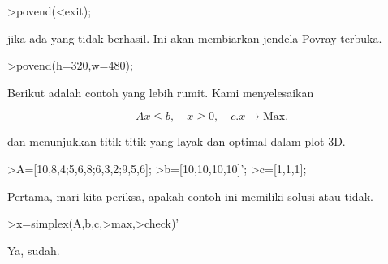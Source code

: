 \documentclass[a4paper,10pt]{article}
\begin{document}
\begin{eulernotebook}
\begin{eulercomment}
\begin{eulercomment}
\begin{eulercomment}
\begin{eulercomment}
\begin{eulercomment}
\begin{eulercomment}
\begin{eulercomment}
\begin{eulercomment}
\begin{eulercomment}
\begin{eulercomment}
\begin{eulercomment}
\end{eulercomment}
\begin{eulerttcomment}
 >povend(<exit);
\end{eulerttcomment}
\begin{eulercomment}

jika ada yang tidak berhasil. Ini akan membiarkan jendela Povray
terbuka.
\end{eulercomment}
\begin{eulerprompt}
>povend(h=320,w=480);
\end{eulerprompt}
\begin{eulercomment}
Berikut adalah contoh yang lebih rumit. Kami menyelesaikan

\end{eulercomment}
\begin{eulerformula}
\[
Ax \le b, \quad x \ge 0, \quad c.x \to \text{Max.}
\]
\end{eulerformula}
\begin{eulercomment}
dan menunjukkan titik-titik yang layak dan optimal dalam plot 3D.
\end{eulercomment}
\begin{eulerprompt}
>A=[10,8,4;5,6,8;6,3,2;9,5,6];
>b=[10,10,10,10]';
>c=[1,1,1];
\end{eulerprompt}
\begin{eulercomment}
Pertama, mari kita periksa, apakah contoh ini memiliki solusi atau
tidak.
\end{eulercomment}
\begin{eulerprompt}
>x=simplex(A,b,c,>max,>check)'
\end{eulerprompt}
\begin{euleroutput}
  [0,  1,  0.5]
\end{euleroutput}
\begin{eulercomment}
Ya, sudah.



\end{eulercomment}
\end{eulercomment}
\end{eulercomment}
\end{eulercomment}
\end{eulercomment}
\end{eulercomment}
\end{eulercomment}
\end{eulercomment}
\end{eulercomment}
\end{eulercomment}
\end{eulercomment}
\end{eulernotebook}
\end{document}
